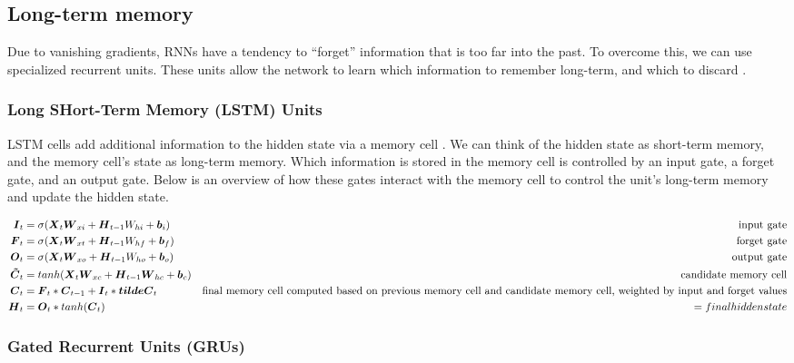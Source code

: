 \documentclass{article}
\begin{document}
\subsection{Long-term memory}

Due to vanishing gradients, RNNs have a tendency to ``forget'' information that is too far into the past. To overcome this, we can use specialized recurrent units. These units allow the network to learn which information to remember long-term, and which to discard \cite{hands-on-ml}.

\subsubsection{Long SHort-Term Memory (LSTM) Units}

LSTM cells add additional information to the hidden state via a memory cell \cite{pml1book}. We can think of the hidden state as short-term memory, and the memory cell's state as long-term memory. Which information is stored in the memory cell is controlled by an input gate, a forget gate, and an output gate. Below is an overview of how these gates interact with the memory cell to control the unit's long-term memory and update the hidden state.

\begin{align*}
    \vb*{I}_t &= \sigma(\vb*{X}_t\vb*{W}_{xi} + \vb*{H}_{t-1}W_{hi} + \vb*{b}_i) & \text{input gate} \\
    \vb*{F}_t &= \sigma(\vb*{X}_t\vb*{W}_{xt} + \vb*{H}_{t-1}W_{hf} + \vb*{b}_f) & \text{forget gate} \\
    \vb*{O}_t &= \sigma(\vb*{X}_t\vb*{W}_{xo} + \vb*{H}_{t-1}W_{ho} + \vb*{b}_o) & \text{output gate} \\
    \vb*{\tilde{C}}_t &= tanh(\vb*{X}_t\vb*{W}_{xc} + \vb*{H}_{t-1}\vb*{W}_{hc} +\vb*{b}_c) & \text{candidate memory cell} \\
    \vb*{C}_t &= \vb*{F}_t * \vb*{C}_{t-1} + \vb*{I}_t * \vb*{tilde{C}}_t & \text{final memory cell computed based on previous memory cell and candidate memory cell, weighted by input and forget values} \\
    \vb*{H}_t &= \vb*{O}_t * tanh(\vb*{C}_t) &= final hidden state
\end{align*}

\subsubsection{Gated Recurrent Units (GRUs)}
\end{document}
